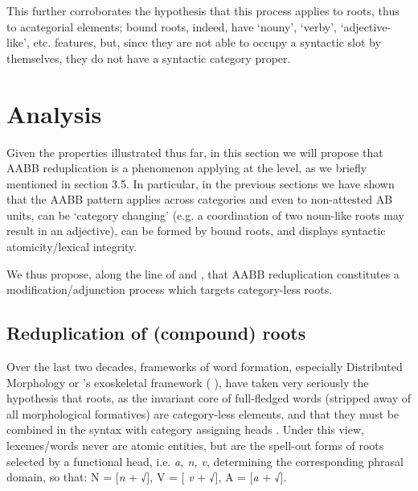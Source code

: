 \documentclass[output=paper]{langsci/langscibook}
\begin{document}
This further corroborates the hypothesis that this process applies to
roots, thus to acategorial elements; bound roots, indeed, have `nouny',
`verby', `adjective-like', etc. features, but, since they are not able
to occupy a syntactic slot by themselves, they do not have a syntactic
category proper.

\section{Analysis}

Given the properties illustrated thus far, in this section we will
propose that AABB reduplication is a phenomenon applying at the 
level, as we briefly mentioned in section 3.5. In particular, in the
previous sections we have shown that the AABB pattern applies across
categories and even to non-attested AB units, can be `category changing'
(e.g. a coordination of two noun-like roots may result in an adjective),
can be formed by bound roots, and displays syntactic atomicity/lexical
integrity.

We thus propose, along the line of %
\citet{Wiltschko2008} %
%
and %
\citet{Zhang2015}%
%
,
that AABB reduplication constitutes a modification/adjunction process
which targets category-less roots.

\subsection{Reduplication of (compound) roots}

Over the last two decades, frameworks of word formation, especially
Distributed Morphology or %
\citeauthor{Borer2003}'s %
exoskeletal framework (%
\citeyear{Borer2003}%
%
), have
taken very seriously the hypothesis that roots, as the invariant core of
full-fledged words (stripped away of all morphological formatives) are
category-less elements, and that they must be combined in the syntax
with category assigning heads %
\citep[see among others][]{Marantz2001,Embick2007,Embick2008}%
%
. Under this view, lexemes/words
never are atomic entities, but are the spell-out forms of roots selected
by a functional head, i.e. \emph{a, n, v}, determining the corresponding
phrasal domain, so that: N = {[}\emph{n} + √{]}, V = {[} \emph{v} +
√{]}, A = {[}\emph{a} + √{]}.
\end{document}
